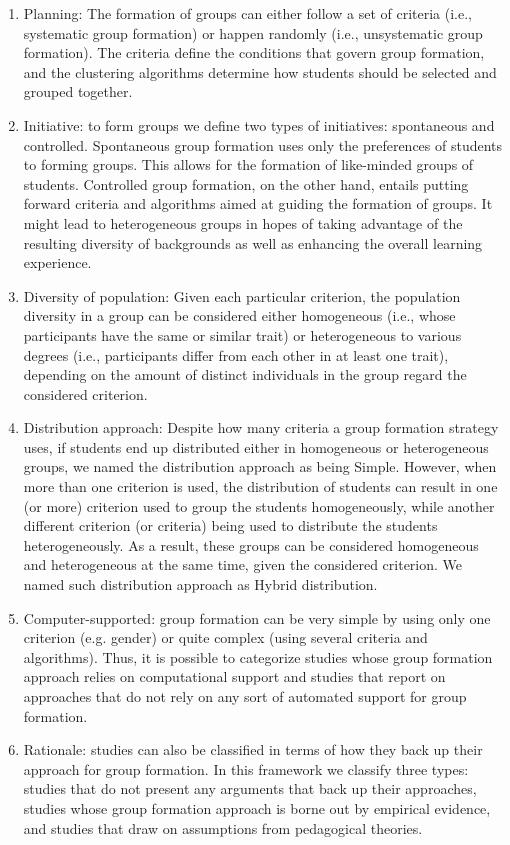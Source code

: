 \begin{enumerate}
\item Planning: The formation of groups can either follow a set of criteria (i.e., systematic group formation) or happen randomly (i.e., unsystematic group formation). The criteria define the conditions that govern group formation, and the clustering algorithms determine how students should be selected and grouped together.
\item Initiative: to form groups we define two types of initiatives: spontaneous and controlled. Spontaneous group formation uses only the preferences of students to forming groups. This allows for the formation of like-minded groups of students. Controlled group formation, on the other hand, entails putting forward criteria and algorithms aimed at guiding the formation of groups. It might lead to heterogeneous groups in hopes of taking advantage of the resulting diversity of backgrounds as well as enhancing the overall learning experience. 
\item Diversity of population: Given each particular criterion, the population diversity in a group can be considered either homogeneous (i.e., whose participants have the same or similar trait) or heterogeneous to various degrees (i.e., participants differ from each other in at least one trait), depending on the amount of distinct individuals in the group regard the considered criterion. 
\item Distribution approach: Despite how many criteria a group formation strategy uses, if students end up distributed either in homogeneous or heterogeneous groups, we named the distribution approach as being Simple. However, when more than one criterion is used, the distribution of students can result in one (or more) criterion used to group the students homogeneously, while another different criterion (or criteria) being used to distribute the students heterogeneously. As a result, these groups can be considered homogeneous and heterogeneous at the same time, given the considered criterion. We named such distribution approach as Hybrid distribution.
\item Computer-supported: group formation can be very simple by using only one criterion (e.g. gender) or quite complex (using several criteria and algorithms). Thus, it is possible to categorize studies whose group formation approach relies on computational support and studies that report on approaches that do not rely on any sort of automated support for group formation.
\item Rationale: studies can also be classified in terms of how they back up their approach for group formation. In this framework we classify three types: studies that do not present any arguments that back up their approaches, studies whose group formation approach is borne out by empirical evidence, and studies that draw on assumptions from pedagogical theories.
\end{enumerate}

